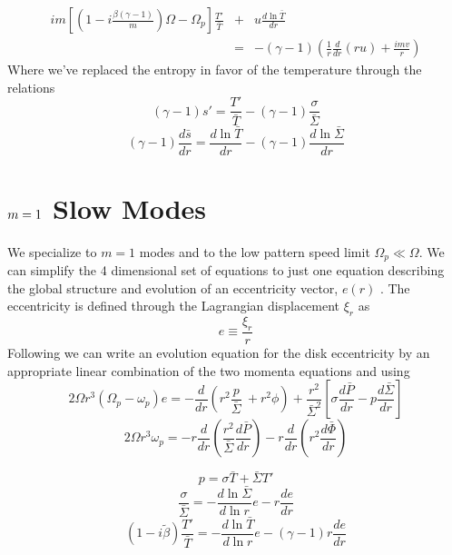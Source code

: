 \documentclass[apj]{emulateapj}
\begin{document}
\begin{eqnarray}  \label{eq:dtT}
i m \left[ \left( 1 - i \frac{\beta(\gamma -1)}{m} \right) \Omega - \Omega_p \right] \frac{T'}{\bar{T} } &+& u \frac{d  \ln \bar{T}}{d r}   \\ 
&=& -(\gamma -1)  \left( \frac{1}{r} \frac{d }{d r} ( r u) + \frac{ i m v}{r } \right) \nonumber
\end{eqnarray}
Where we've replaced the entropy in favor of the temperature through the relations
\begin{equation}
(\gamma -1)s' = \frac{ T'}{ \bar{T}} - (\gamma -1 ) \frac{ \sigma}{ \bar{\Sigma}} 
\end{equation}
\begin{equation}
(\gamma -1)\frac{d \bar{s}}{d r} = \frac{d \ln \bar{T}}{d r} - (\gamma -1) \frac{ d \ln \bar{\Sigma}}{d r} 
\end{equation}


\section{ $\MakeLowercase{m}=1$ Slow Modes }
We specialize to $m=1$ modes and to the low pattern speed limit $\Omega_p \ll \Omega$. We can simplify the 4 dimensional set of equations to just one equation describing the global structure and evolution of an eccentricity vector, $e(r)$ \citep{og01,go06,papa02}. The eccentricity is defined through the Lagrangian displacement $\xi_r$ as 
\begin{equation}
e \equiv \frac{ \xi_r} {r} 
\end{equation}
 Following \cite{papa02} we can write an evolution equation for the disk eccentricity by an appropriate linear combination of the two momenta equations and using 
 \begin{equation}
2 \Omega r^3 ( \Omega_p - \omega_p) e = - \frac{d }{dr} \left( r^2 \frac{p}{\bar{\Sigma}} \ + r^2 \phi \right) + \frac{r^2}{\bar{\Sigma}^2} \left[  \sigma \frac{ d \bar{P}}{d r}-p \frac{d \bar{\Sigma}}{d r} \right]
\end{equation}
\begin{equation} \label{eq:wp_def}
2 \Omega r^3 \omega_p = - r \frac{d}{dr} \left( \frac{r^2}{\bar{\Sigma}} \frac{d \bar{P}}{d r} \right) - r \frac{ d}{dr} \left( r^2 \frac{d \bar{\Phi}}{dr} \right)
\end{equation}

 \begin{equation}
p = \sigma \bar{T} + \bar{\Sigma} T'
\end{equation}
 \begin{equation}
\frac{\sigma}{\bar{\Sigma}} = - \frac{d \ln \bar{\Sigma}}{ d \ln r} e - r \frac{d e}{d r} 
\end{equation}
\begin{equation}
(1- i\tilde{\beta}) \frac{T'}{\bar{T}} = -\frac{d \ln \bar{T}}{d \ln r} e - (\gamma -1) r \frac{d e}{d r}
\end{equation}
\end{document}
